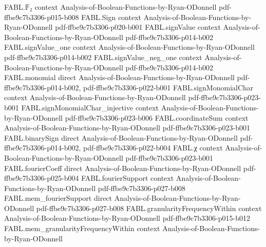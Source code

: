 \begin{theorem}
\label{FABL.goldreichLevinQueryProgram_queries_le}
\leanok
{}
\proofstep
  {FABL.𝔽₂}
  {context}
  {Analysis-of-Boolean-Functions-by-Ryan-ODonnell}
  {pdf-ffbe9c7b3306-p015-b008}
\proofstep
  {FABL.Sign}
  {context}
  {Analysis-of-Boolean-Functions-by-Ryan-ODonnell}
  {pdf-ffbe9c7b3306-p020-b001}
\proofstep
  {FABL.signValue}
  {context}
  {Analysis-of-Boolean-Functions-by-Ryan-ODonnell}
  {pdf-ffbe9c7b3306-p014-b002}
\proofstep
  {FABL.signValue_one}
  {context}
  {Analysis-of-Boolean-Functions-by-Ryan-ODonnell}
  {pdf-ffbe9c7b3306-p014-b002}
\proofstep
  {FABL.signValue_neg_one}
  {context}
  {Analysis-of-Boolean-Functions-by-Ryan-ODonnell}
  {pdf-ffbe9c7b3306-p014-b002}
\proofstep
  {FABL.monomial}
  {direct}
  {Analysis-of-Boolean-Functions-by-Ryan-ODonnell}
  {pdf-ffbe9c7b3306-p014-b002,
    pdf-ffbe9c7b3306-p022-b001}
\proofstep
  {FABL.signMonomialChar}
  {context}
  {Analysis-of-Boolean-Functions-by-Ryan-ODonnell}
  {pdf-ffbe9c7b3306-p023-b001}
\proofstep
  {FABL.signMonomialChar_injective}
  {context}
  {Analysis-of-Boolean-Functions-by-Ryan-ODonnell}
  {pdf-ffbe9c7b3306-p023-b006}
\proofstep
  {FABL.coordinateSum}
  {context}
  {Analysis-of-Boolean-Functions-by-Ryan-ODonnell}
  {pdf-ffbe9c7b3306-p023-b001}
\proofstep
  {FABL.binarySign}
  {direct}
  {Analysis-of-Boolean-Functions-by-Ryan-ODonnell}
  {pdf-ffbe9c7b3306-p014-b002,
    pdf-ffbe9c7b3306-p022-b004}
\proofstep
  {FABL.χ}
  {context}
  {Analysis-of-Boolean-Functions-by-Ryan-ODonnell}
  {pdf-ffbe9c7b3306-p023-b001}
\proofstep
  {FABL.fourierCoeff}
  {direct}
  {Analysis-of-Boolean-Functions-by-Ryan-ODonnell}
  {pdf-ffbe9c7b3306-p025-b004}
\proofstep
  {FABL.fourierSupport}
  {context}
  {Analysis-of-Boolean-Functions-by-Ryan-ODonnell}
  {pdf-ffbe9c7b3306-p027-b008}
\proofstep
  {FABL.mem_fourierSupport}
  {direct}
  {Analysis-of-Boolean-Functions-by-Ryan-ODonnell}
  {pdf-ffbe9c7b3306-p027-b008}
\proofstep
  {FABL.granularityFrequencyWithin}
  {context}
  {Analysis-of-Boolean-Functions-by-Ryan-ODonnell}
  {pdf-ffbe9c7b3306-p015-b012}
\proofstep
  {FABL.mem_granularityFrequencyWithin}
  {context}
  {Analysis-of-Boolean-Functions-by-Ryan-ODonnell}

\end{theorem}
